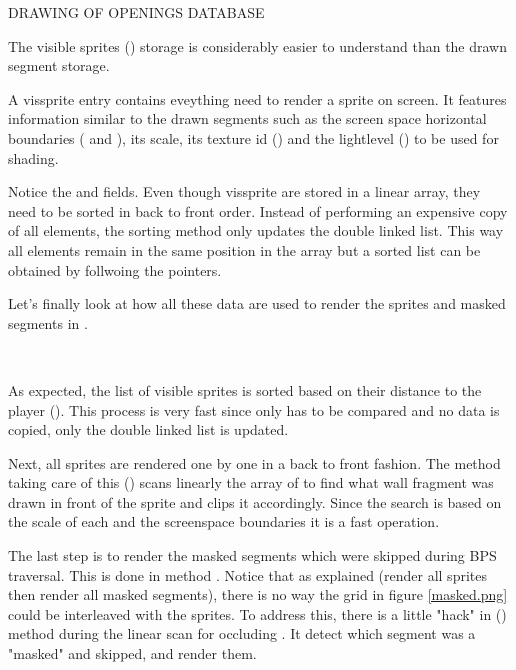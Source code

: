 \par
DRAWING OF OPENINGS DATABASE\\
\vspace{4.5cm}
\par
The visible sprites () storage is considerably easier to understand than the drawn segment storage.\\
\par
{}
\par
A vissprite entry contains eveything need to render a sprite on screen. It features information similar to the drawn segments such as the screen space horizontal boundaries ( and ), its scale, its texture id () and the lightlevel () to be used for shading.\\
\par
Notice the  and  fields. Even though vissprite are stored in a linear array, they need to be sorted in back to front order. Instead of performing an expensive copy of all elements, the sorting method only updates the double linked list. This way all elements remain in the same position in the array but a sorted list can be obtained by follwoing the  pointers.\\
\par

Let's finally look at how all these data are used to render the sprites and masked segments in .\\
\par
{}\\
\par
As expected, the list of visible sprites is sorted based on their distance to the player (). This process is very fast since only  has to be compared and no data is copied, only the double linked list is updated.\\
\par
Next, all sprites are rendered one by one in a back to front fashion. The method taking care of this () scans linearly the array of  to find what wall fragment was drawn in front of the sprite and clips it accordingly. Since the search is based on the scale of each  and the screenspace  boundaries it is a fast operation.\\
\par
The last step is to render the masked segments which were skipped during BPS traversal. This is done in method . Notice that as explained (render all sprites then render all masked segments), there is no way the grid in figure  \ref{masked.png} could be interleaved with the sprites. To address this, there is a little "hack" in () method during the linear scan for occluding . It detect which segment was a "masked" and skipped, and render them.\\
\par
{}\\
\par



